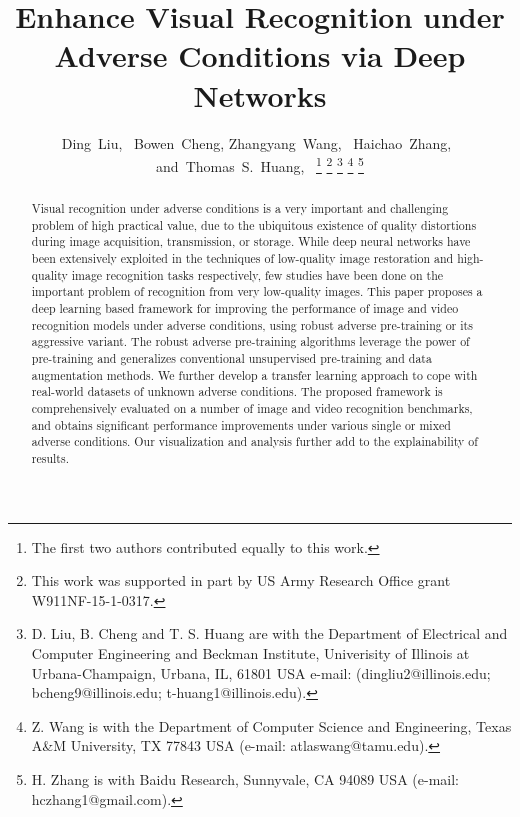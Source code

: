 \documentclass[10pt,twocolumn,twoside]{IEEEtran} %
\begin{document}
\title{Enhance Visual Recognition under Adverse Conditions via Deep Networks}

\author{Ding~Liu,~
        Bowen~Cheng,
        Zhangyang~Wang,~
        Haichao~Zhang,~
        and~Thomas~S.~Huang,~%
\thanks{The first two authors contributed equally to this work.}
\thanks{This work was supported in part by US Army Research Office grant W911NF-15-1-0317.}
\thanks{D. Liu, B. Cheng and T. S. Huang are with the Department
of Electrical and Computer Engineering and Beckman Institute, Univerisity of Illinois at Urbana-Champaign, Urbana,
IL, 61801 USA e-mail: (dingliu2@illinois.edu; bcheng9@illinois.edu; t-huang1@illinois.edu).}%
\thanks{Z. Wang is with the Department of Computer Science and Engineering, Texas A\&M University, TX 77843 USA (e-mail: atlaswang@tamu.edu).}
\thanks{H. Zhang is with Baidu Research, Sunnyvale, CA 94089 USA (e-mail: hczhang1@gmail.com).}
}















\maketitle

\begin{abstract}

Visual recognition under adverse conditions is a very important and challenging problem of high practical value, due to the ubiquitous existence of quality distortions during image acquisition, transmission, or storage.
While deep neural networks have been extensively exploited in the techniques of low-quality image restoration and high-quality image recognition tasks respectively, few studies have been done on the important problem of recognition from very low-quality images. 
This paper proposes a deep learning based framework for improving the performance of image and video recognition models under adverse conditions, using robust adverse pre-training or its aggressive variant. 
The robust adverse pre-training algorithms leverage the power of pre-training and generalizes conventional unsupervised pre-training and data augmentation methods. 
We further develop a transfer learning approach to cope with real-world datasets of unknown adverse conditions. 
The proposed framework is comprehensively evaluated on a number of image and video recognition benchmarks, and obtains significant performance improvements under various single or mixed adverse conditions. 
Our visualization and analysis further add to the explainability of results.



\end{abstract}
\end{document}
